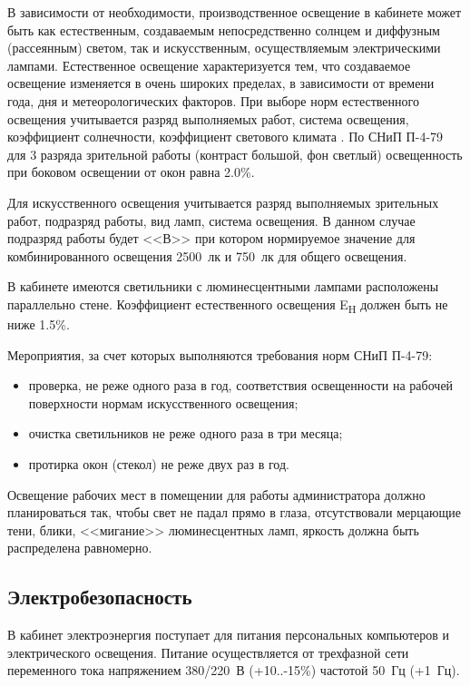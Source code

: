 В зависимости от необходимости, производственное освещение в кабинете может быть как естественным, создаваемым непосредственно солнцем и диффузным (рассеянным) светом, так и искусственным, осуществляемым электрическими лампами.
Естественное освещение характеризуется тем, что создаваемое освещение изменяется в очень широких пределах, в зависимости от времени года, дня и метеорологических факторов.
При выборе норм естественного освещения учитывается разряд выполняемых работ, система освещения, коэффициент солнечности, коэффициент светового климата \cite{oot}.
По СНиП П-4-79 для 3 разряда зрительной работы (контраст большой, фон светлый) освещенность при боковом освещении от окон равна 2.0\%.

Для искусственного освещения учитывается разряд выполняемых зрительных работ, подразряд работы, вид ламп, система освещения.
В данном случае подразряд работы будет <<В>> при котором нормируемое значение для комбинированного освещения 2500~лк и 750~лк для общего освещения.

В кабинете имеются светильники с люминесцентными лампами расположены параллельно стене.
Коэффициент естественного освещения E\textsubscript{H} должен быть не ниже 1.5\%.

Мероприятия, за счет которых выполняются требования норм СНиП П-4-79:
\begin{itemize}
  \item проверка, не реже одного раза в год, соответствия освещенности на рабочей поверхности нормам искусственного освещения;
  \item очистка светильников не реже одного раза в три месяца;
  \item протирка окон (стекол) не реже двух раз в год.
\end{itemize}

Освещение рабочих мест в помещении для работы администратора должно планироваться так, чтобы свет не падал прямо в глаза, отсутствовали мерцающие тени, блики, <<мигание>> люминесцентных ламп, яркость должна быть распределена равномерно. 

\subsection{Электробезопасность}

В кабинет электроэнергия поступает для питания персональных компьютеров и электрического освещения.
Питание осуществляется от трехфазной сети переменного тока напряжением 380/220~В (+10..-15\%) частотой 50~Гц (+1~Гц).

